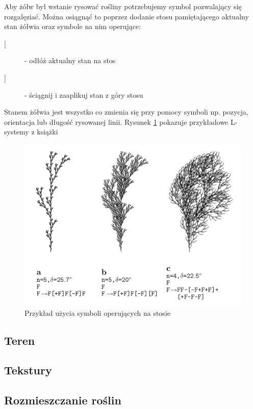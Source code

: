 \documentclass[inz,longabstract]{iithesis}
\begin{document}
            Aby żółw był wstanie rysować rośliny potrzebujemy symbol pozwalający się rozgałęziać. Można osiągnąć to poprzez dodanie stosu pamiętającego aktualny stan żółwia oraz symbole na nim operujące:
            \begin{description}
                \item[{[}] - odłóż aktualny stan na stos
                \item[{]}] - ściągnij i zaaplikuj stan z góry stosu 
            \end{description}
            Stanem żółwia jest wszystko co zmienia się przy pomocy symboli np. pozycja, orientacja lub długość rysowanej linii. Rysunek \ref{fig:lsystemPlants} pokazuje przykładowe L-systemy z książki \cite{plants} 
            \begin{figure}
                \includegraphics[width=\linewidth]{lsystemPlants.png}
                \caption{Przykład użycia symboli operujących na stosie\cite{plants}} 
                \label{fig:lsystemPlants}
            \end{figure}
            
        \subsection{Teren}
        \subsection{Tekstury}
        \subsection{Rozmieszczanie roślin}
\end{document}
